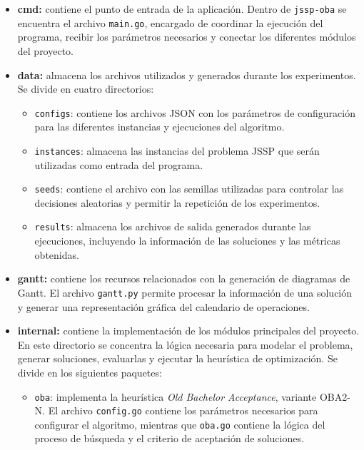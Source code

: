 \documentclass[12pt,a4paper]{article}
\begin{document}
\begin{itemize}

\item \textbf{cmd:} contiene el punto de entrada de la aplicación. Dentro de \texttt{jssp-oba} se encuentra el archivo \texttt{main.go}, encargado de coordinar la ejecución del programa, recibir los parámetros necesarios y conectar los diferentes módulos del proyecto.

\item \textbf{data:} almacena los archivos utilizados y generados durante los experimentos. Se divide en cuatro directorios:
  \begin{itemize}
  \item \texttt{configs}: contiene los archivos JSON con los parámetros de configuración para las diferentes instancias y ejecuciones del algoritmo.

  \item \texttt{instances}: almacena las instancias del problema JSSP que serán utilizadas como entrada del programa.

  \item \texttt{seeds}: contiene el archivo con las semillas utilizadas para controlar las decisiones aleatorias y permitir la repetición de los experimentos.

  \item \texttt{results}: almacena los archivos de salida generados durante las ejecuciones, incluyendo la información de las soluciones y las métricas obtenidas.
  \end{itemize}

\item \textbf{gantt:} contiene los recursos relacionados con la generación de diagramas de Gantt. El archivo \texttt{gantt.py} permite procesar la información de una solución y generar una representación gráfica del calendario de operaciones.

\item \textbf{internal:} contiene la implementación de los módulos principales del proyecto. En este directorio se concentra la lógica necesaria para modelar el problema, generar soluciones, evaluarlas y ejecutar la heurística de optimización. Se divide en los siguientes paquetes:

  \begin{itemize}

  \item \texttt{oba}: implementa la heurística \textit{Old Bachelor Acceptance}, variante OBA2-N. El archivo \texttt{config.go} contiene los parámetros necesarios para configurar el algoritmo, mientras que \texttt{oba.go} contiene la lógica del proceso de búsqueda y el criterio de aceptación de soluciones.


\end{itemize}
\end{itemize}
\end{document}
